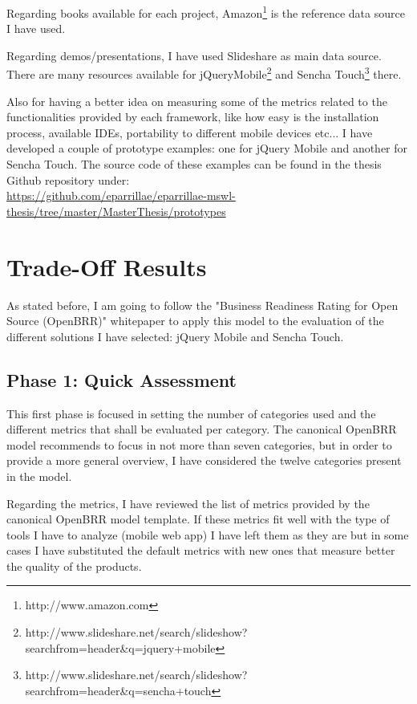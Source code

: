 \documentclass[a4paper,12pt]{book}
\begin{document}
Regarding books available for each project, Amazon\footnote{http://www.amazon.com} is the reference data source I have used.

Regarding demos/presentations, I have used Slideshare as main data source. There are many resources available for jQueryMobile\footnote{http://www.slideshare.net/search/slideshow?searchfrom=header\&q=jquery+mobile}  and Sencha Touch\footnote{http://www.slideshare.net/search/slideshow?searchfrom=header\&q=sencha+touch}  there.

Also for having a better idea on measuring some of the metrics related to the functionalities provided by each framework, like how easy is the installation process, available IDEs, portability to different mobile devices etc... I have developed a couple of prototype examples: one for jQuery Mobile and another for Sencha Touch. The source code of these examples can be found in the thesis Github repository under:\\

\url{https://github.com/eparrillae/eparrillae-mswl-thesis/tree/master/MasterThesis/prototypes}


\chapter{Trade-Off Results}
\label{chap:results}

As stated before, I am going to follow the "Business Readiness Rating for Open Source
(OpenBRR)" whitepaper\cite{OpenBRRWhitepaper} to apply this model to the evaluation of the different solutions I have selected: jQuery Mobile and Sencha Touch.

\section{Phase 1: Quick Assessment}
\label{sec:phase1}
This first phase is focused in setting the number of categories used and the different metrics that shall be evaluated per category. The canonical OpenBRR model recommends to focus in not more than seven categories, but in order to provide a more general overview, I have considered the twelve categories present in the model.

Regarding the metrics, I have reviewed the list of metrics provided by the canonical OpenBRR model template. If these metrics fit well with the type of tools I have to analyze (mobile web app) I have left them as they are but in some cases I have substituted the default metrics with new ones that measure better the quality of the products.
\end{document}
